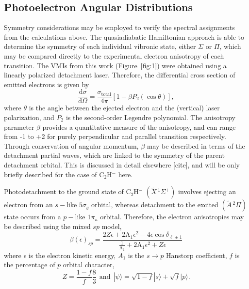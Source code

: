 \documentclass[journal=jpcafh,manuscript=article,layout=onecolumn, 12pt]{achemso}
\begin{document}

\subsection{Photoelectron Angular Distributions}
Symmetry considerations may be employed to verify the spectral assignments from the calculations above. The quasiadiabatic Hamiltonian approach is able to determine the symmetry of each individual vibronic state, either $\Sigma$ or $\Pi$, which may be compared directly to the experimental electron anisotropy of each transition. The VMIs from this work (Figure~\ref{fig:1}) were obtained using a linearly polarized detachment laser. Therefore, the differential cross section of emitted electrons is given by  
\begin{equation}
	\frac{\text{d}\sigma}{\text{d}\Omega}=\frac{\sigma_{\text{total}}}{4\pi}[1+\beta P_{2}(\cos\theta)],
	\label{eq:beta1}
\end{equation}
where $\theta$ is the angle between the ejected electron and the (vertical) 
laser polarization, and $P_2$ is the second-order Legendre polynomial. The anisotropy parameter $\beta$ provides a quantitative measure of the anisotropy, and can range from -1 to +2 for purely perpendicular and parallel transition respectively. Through conservation of angular momentum, $\beta$ may be described in terms of the detachment partial waves, which are linked to the symmetry of the parent detachment orbital. This is discussed in detail elsewhere [cite], and will be only briefly described for the case of C$_2$H$^-$ here. 

Photodetachment to the ground state of C$_2$H$^-$ $(\tilde{X}\,^1\Sigma^+)$ involves ejecting an electron from an $s-$like $5\sigma_g$ orbital, whereas detachment to the excited $(\tilde{A}\,^2\Pi)$ state occurs from a $p-$like $1\pi_u$ orbital. Therefore, the electron anisotropies may be described using the mixed $sp$ model,
\begin{equation}
\beta(\epsilon)_{sp} = \frac{2Z\epsilon+2\text{A}_1\epsilon^2-4\epsilon\cos\delta_{\ell\pm 1}}{\frac{1}{\text{A}_1}+2\text{A}_1\epsilon^2+Z\epsilon}
\label{eq:beta-sanov}
\end{equation}  
where $\epsilon$ is the electron kinetic energy, $A_1$ is the $s\rightarrow p$ Hanstorp coefficient, $f$ is the percentage of $p$ orbital character,
\begin{equation}
Z = \frac{1-f}{f}\frac{8}{3}~~ \text{and} ~~ |\psi\rangle = \sqrt{1-f}|s\rangle + \sqrt{f}|p\rangle.
\end{equation}
\end{document}
